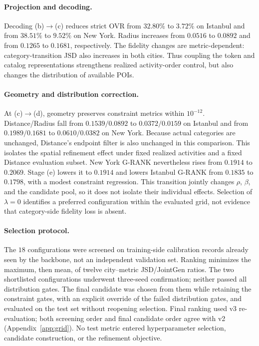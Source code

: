\paragraph{Projection and decoding.}
Decoding (b)$\to$(c) reduces strict OVR from $32.80\%$ to $3.72\%$ on Istanbul
and from $38.51\%$ to $9.52\%$ on New York. Radius increases from $0.0516$ to
$0.0892$ and from $0.1265$ to $0.1681$, respectively. The fidelity changes are
metric-dependent: category-transition JSD also increases in both cities.
Thus coupling the token and catalog representations strengthens realized
activity-order control, but also changes the distribution of available POIs.
\paragraph{Geometry and distribution correction.}
At (c)$\to$(d), geometry preserves constraint metrics within $10^{-12}$.
Distance/Radius fall from $0.1539/0.0892$ to $0.0372/0.0159$ on Istanbul and
from $0.1989/0.1681$ to $0.0610/0.0382$ on New York.
Because actual categories are unchanged, Distance's endpoint filter is also
unchanged in this comparison. This isolates the spatial refinement effect under
fixed realized activities and a fixed Distance evaluation subset.
New York G-RANK nevertheless rises from $0.1914$ to $0.2069$.
Stage (e) lowers it to $0.1914$ and lowers Istanbul G-RANK from $0.1835$ to
$0.1798$, with a modest constraint regression. This transition jointly changes
$\rho$, $\beta$, and the candidate pool, so it does not isolate their individual
effects. Selection of $\lambda=0$ identifies a preferred configuration within
the evaluated grid, not evidence that category-side fidelity loss is absent.
\paragraph{Selection protocol.}
The $18$ configurations were screened on training-side calibration records
already seen by the backbone, not an independent validation set.
Ranking minimizes the maximum, then mean, of twelve city--metric JSD/JointGen
ratios. The two shortlisted configurations underwent three-seed confirmation;
neither passed all distribution gates. The final candidate was chosen from
them while retaining the constraint gates, with an explicit override of the
failed distribution gates, and evaluated on the test set without reopening
selection. Final ranking used v3 re-evaluation; both screening order and final
candidate order agree with v2 (Appendix~\ref{app:grid}).
No test metric entered hyperparameter selection, candidate construction, or
the refinement objective.
